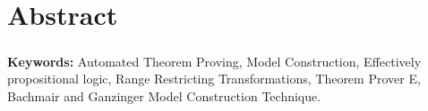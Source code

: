 \chapter*{Abstract}
\label{chap:abstract}


\begin{comment}
In the past few decades the field of automated theorem proving (ATP) has been flourishing and improving a lot by the enormous amount of research devoted to it. That interest came from its importance as well as its various uses in different fields such as mathematical reasoning.



ATP comes along with another process which is model generation/computation/construction from a certain (counter) satisfiable specification/problem. Model generation has usages that ATP alone wont have the effect that it has with it, and that could be noticed in Software/Hardware verification, debugging various systems.



Here in this project we added a model generation technique for a subclass in First Order Logic named Effectively Propositional Calculus in an existing theorem prover "E" where we transform the axioms of the specification into a certain form called range restricted form, and then after reaching saturation, we apply Bachmair and Ganzinger model construction technique to get the model.



Automated theorem proving has applications in mathematics, verification, common-sense reasoning, and many other domains. It can demonstrate the compliance of a system with certain requirements. However, it is often just as important to show that a desired property is not met. This can be done by constructing a counter-model, or, in simpler words, a counter-example. In this talk we describe the implementation of techniques that enable the theorem prover E to find such counter-examples for effectively propositional proof problems, and to give an explicit counter-models to the user.
\end{comment}

\paragraph{}
\textbf{Keywords:} Automated Theorem Proving, Model Construction, Effectively propositional logic, Range Restricting Transformations, Theorem Prover E, Bachmair and Ganzinger Model Construction Technique.  